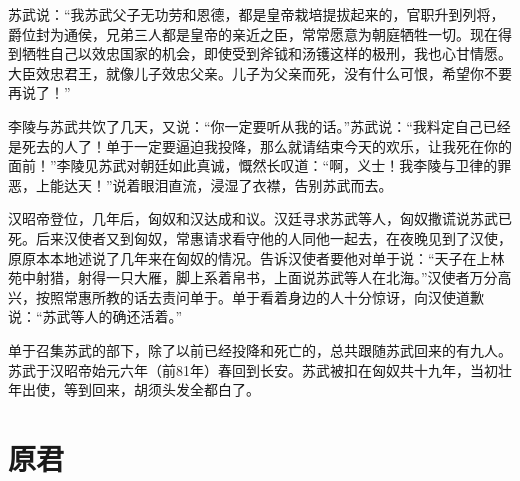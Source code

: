\documentclass[12pt,UTF-8,openany]{ctexbook}
\begin{document}
\begin{normalsize}
    苏武说：“我苏武父子无功劳和恩德，都是皇帝栽培提拔起来的，官职升到列将，爵位封为通侯，兄弟三人都是皇帝的亲近之臣，常常愿意为朝庭牺牲一切。现在得到牺牲自己以效忠国家的机会，即使受到斧钺和汤镬这样的极刑，我也心甘情愿。大臣效忠君王，就像儿子效忠父亲。儿子为父亲而死，没有什么可恨，希望你不要再说了！”
    
    李陵与苏武共饮了几天，又说：“你一定要听从我的话。”苏武说：“我料定自己已经是死去的人了！单于一定要逼迫我投降，那么就请结束今天的欢乐，让我死在你的面前！”李陵见苏武对朝廷如此真诚，慨然长叹道：“啊，义士！我李陵与卫律的罪恶，上能达天！”说着眼泪直流，浸湿了衣襟，告别苏武而去。
    
    汉昭帝登位，几年后，匈奴和汉达成和议。汉廷寻求苏武等人，匈奴撒谎说苏武已死。后来汉使者又到匈奴，常惠请求看守他的人同他一起去，在夜晚见到了汉使，原原本本地述说了几年来在匈奴的情况。告诉汉使者要他对单于说：“天子在上林苑中射猎，射得一只大雁，脚上系着帛书，上面说苏武等人在北海。”汉使者万分高兴，按照常惠所教的话去责问单于。单于看着身边的人十分惊讶，向汉使道歉说：“苏武等人的确还活着。”
    
    单于召集苏武的部下，除了以前已经投降和死亡的，总共跟随苏武回来的有九人。苏武于汉昭帝始元六年（前81年）春回到长安。苏武被扣在匈奴共十九年，当初壮年出使，等到回来，胡须头发全都白了。
    
\end{normalsize}



\chapter{原君}
\end{document}
